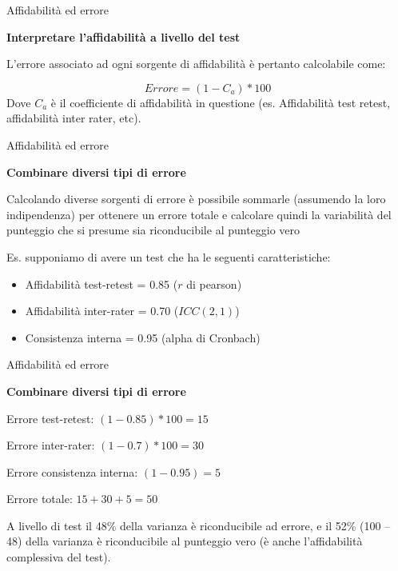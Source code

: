 \documentclass[
  ignorenonframetext,
]{beamer}
\providecommand{\tightlist}{%
  \setlength{\itemsep}{0pt}\setlength{\parskip}{0pt}}
\begin{document}
\begin{frame}{Affidabilità ed errore}
\label{affidabilituxe0-ed-errore-1}
\begin{center}
  \textbf{Interpretare l'affidabilità a livello del test}
\end{center}

L'errore associato ad ogni sorgente di affidabilità è pertanto
calcolabile come:

\[
Errore = (1-C_a)*100
\] Dove \(C_a\) è il coefficiente di affidabilità in questione (es.
Affidabilità test retest, affidabilità inter rater, etc).
\end{frame}

\begin{frame}{Affidabilità ed errore}
\label{affidabilituxe0-ed-errore-2}
\begin{center}
  \textbf{Combinare diversi tipi di errore}
\end{center}

Calcolando diverse sorgenti di errore è possibile sommarle (assumendo la
loro indipendenza) per ottenere un errore totale e calcolare quindi la
variabilità del punteggio che si presume sia riconducibile al punteggio
vero

Es. supponiamo di avere un test che ha le seguenti caratteristiche:

\begin{itemize}
\tightlist
\item
  Affidabilità test-retest = 0.85 (\(r\) di pearson)
\item
  Affidabilità inter-rater = 0.70 (\(ICC(2,1)\))
\item
  Consistenza interna = 0.95 (alpha di Cronbach)
\end{itemize}
\end{frame}

\begin{frame}{Affidabilità ed errore}
\label{affidabilituxe0-ed-errore-3}
\begin{center}
  \textbf{Combinare diversi tipi di errore}
\end{center}

Errore test-retest: \((1-0.85) * 100 = 15%
\)

Errore inter-rater: \((1-0.7) * 100 = 30%
\)

Errore consistenza interna: \((1-0.95) = 5%
\)

Errore totale: \(15 + 30 + 5 = 50%
\) \vspace{2em}

A livello di test il 48\% della varianza è riconducibile ad errore, e il
52\% (100 -- 48) della varianza è riconducibile al punteggio vero (è
anche l'affidabilità complessiva del test).
\end{frame}
\end{document}
